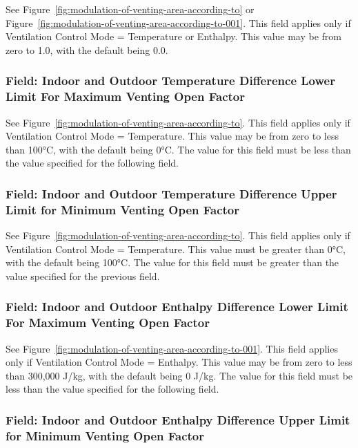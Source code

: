 See Figure~\ref{fig:modulation-of-venting-area-according-to} or Figure~\ref{fig:modulation-of-venting-area-according-to-001}. This field applies only if Ventilation Control Mode = Temperature or Enthalpy. This value may be from zero to 1.0, with the default being 0.0.

\subsubsection{Field: Indoor and Outdoor Temperature Difference Lower Limit For Maximum Venting Open Factor}\label{field-indoor-and-outdoor-temperature-difference-lower-limit-for-maximum-venting-open-factor-1}

See Figure~\ref{fig:modulation-of-venting-area-according-to}. This field applies only if Ventilation Control Mode = Temperature. This value may be from zero to less than 100°C, with the default being 0°C. The value for this field must be less than the value specified for the following field.

\subsubsection{Field: Indoor and Outdoor Temperature Difference Upper Limit for Minimum Venting Open Factor}\label{field-indoor-and-outdoor-temperature-difference-upper-limit-for-minimum-venting-open-factor-1}

See Figure~\ref{fig:modulation-of-venting-area-according-to}. This field applies only if Ventilation Control Mode = Temperature. This value must be greater than 0°C, with the default being 100°C. The value for this field must be greater than the value specified for the previous field.

\subsubsection{Field: Indoor and Outdoor Enthalpy Difference Lower Limit For Maximum Venting Open Factor}\label{field-indoor-and-outdoor-enthalpy-difference-lower-limit-for-maximum-venting-open-factor-1}

See Figure~\ref{fig:modulation-of-venting-area-according-to-001}. This field applies only if Ventilation Control Mode = Enthalpy. This value may be from zero to less than 300,000 J/kg, with the default being 0 J/kg. The value for this field must be less than the value specified for the following field.

\subsubsection{Field: Indoor and Outdoor Enthalpy Difference Upper Limit for Minimum Venting Open Factor}\label{field-indoor-and-outdoor-enthalpy-difference-upper-limit-for-minimum-venting-open-factor-1}

